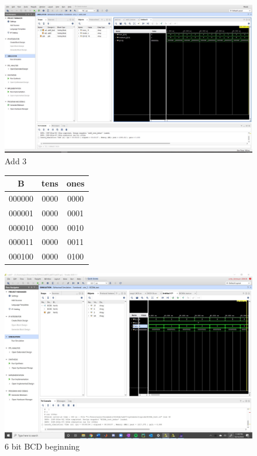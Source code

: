\documentclass[11pt]{article}
\begin{document}
\begin{figure}[ht] \centering
	\includegraphics[width=1\textwidth,trim=32cm 20cm 0cm 4cm,clip]{add3_test_screen}
	\caption{Add 3}
	\label{fig:img1}
\end{figure}


\begin{figure}[ht] \centering
	
	\begin{tabular}{c|cc}
		\toprule
		B & tens & ones \\
		\midrule
		000000 & 0000 & 0000 \\
		000001 & 0000 & 0001 \\
		000010 & 0000 & 0010 \\
		000011 & 0000 & 0011 \\
		000100 & 0000 & 0100 \\
		\bottomrule
	\end{tabular}
 
	\includegraphics[width=1\textwidth,trim=19cm 15cm 0cm 6cm,clip]{BCD6b_test_screen}
	\caption{6 bit BCD beginning}
	\label{fig:img2}
\end{figure}
\end{document}
